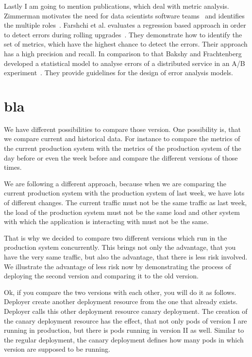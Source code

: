 Lastly I am going to mention publications, which deal with metric analysis. Zimmerman
motivates the need for data scientists software teams~\cite{data_science_role2} and
identifies the multiple roles~\cite{data_science_role}. Farshchi et al. evaluates a
regression based approach in order to detect errors during rolling
upgrades~\cite{anomaly_detection}. They demonstrate how to identify the set of metrics,
which have the highest chance to detect the errors. Their approach has a high precision
and recall. In comparison to that Bakshy and Frachtenberg developed a statistical model to
analyse errors of a distributed service in an A/B
experiment~\cite{error_analysis_of_distr_system}. They provide guidelines for the design
of error analysis models.

\section{bla}

We have different possibilities to compare those version. One possibility is, that we
compare current and historical data. For instance to compare the metrics of the current
production system with the metrics of the production system of the day before or even the
week before and compare the different versions of those times.

We are following a different approach, because when we are comparing the current
production system with the production system of last week, we have lots of different
changes. The current traffic must not be the same traffic as last week, the load of the
production system must not be the same load and other system with which the application is
interacting with must not be the same.

That is why we decided to compare two different versions which run in the production
system concurrently. This brings not only the advantage, that you have the very same
traffic, but also the advantage, that there is less risk involved. We illustrate the
advantage of less risk now by demonstrating the process of deploying the second version
and comparing it to the old version.

Ok, if you compare the two versions with each other, you will do it as follows. Deployer
create another deployment resource from the one that already exists. Deployer calls this
other deployment resource canary deployment. The creation of the canary deployment
resource has the effect, that not only pods of version I are running in production, but
there is pods running in version II as well. Similar to the regular deployment, the canary
deployment defines how many pods in which version are supposed to be running.


